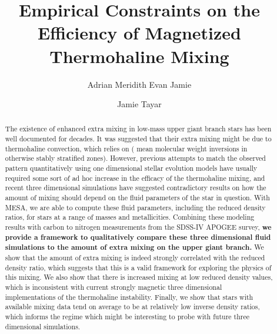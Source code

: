 \documentclass[linenumbers,twocolumn]{aastex62}
\begin{document}
\title{Empirical Constraints on the Efficiency of Magnetized Thermohaline Mixing}

\author{Adrian Meridith Evan Jamie}


\author[0000-0002-4818-7885]{Jamie Tayar}


\begin{abstract}
The existence of enhanced extra mixing in low-mass upper giant branch stars has been well documented for decades. It was suggested that their extra mixing might be due to thermohaline convection, which relies on ( mean molecular weight inversions in otherwise stably stratified zones). However, previous attempts to match the observed pattern quantitatively using one dimensional stellar evolution models have usually required some sort of ad hoc increase in the efficacy of the thermohaline mixing, and recent three dimensional simulations  have suggested contradictory results on how the amount of mixing should depend on the fluid parameters of the star in question. With MESA, we are able to compute these fluid parameters, including the reduced density ratios, for stars at a range of masses and metallicities. Combining these modeling results with carbon to nitrogen measurements from the SDSS-IV APOGEE survey, \textbf{we provide a framework to qualitatively compare these three dimensional fluid simulations to the amount of extra mixing on the upper giant branch.} We show that the amount of extra mixing is indeed strongly correlated with the reduced density ratio, which suggests that this is a valid framework for exploring the physics of this mixing. We also show that there is increased mixing at low reduced density values, which is inconsistent with current strongly magnetic three dimensional implementations of the thermohaline instability. Finally, we show that stars with available mixing data tend on average to be at relatively low inverse density ratios, which informs the regime which might be interesting to probe with future three dimensional simulations. %
\end{abstract}
\end{document}

